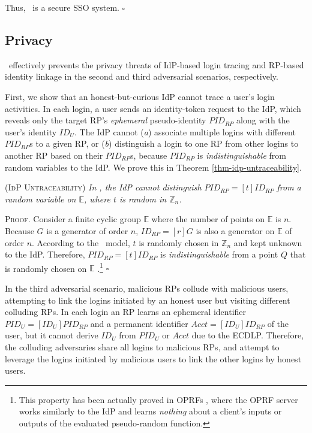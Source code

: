 Thus, \usso\ is a secure SSO system.
\hfill $\square$


\subsection{Privacy}
\label{sec-:analysis}
\usso\ effectively prevents the privacy threats of IdP-based login tracing and RP-based identity linkage in the second and third adversarial scenarios, respectively.

\newc
First, we show that an honest-but-curious IdP cannot trace a user's login activities. In each login, a user sends an identity-token request to the IdP, %
which reveals only the target RP's \emph{ephemeral} pseudo-identity $PID_{RP}$ along with the user's identity $ID_U$.
The IdP cannot (\emph{a}) associate multiple logins with different $PID_{RP}$s to a given RP, or (\emph{b}) distinguish a login to one RP from other logins to another RP based on their $PID_{RP}$s, because $PID_{RP}$ is \emph{indistinguishable} from random variables to the IdP.
We prove this in Theorem \ref{thm-idp-untraceability}.

\begin{thm}
\textsc{(IdP Untraceability)} \emph{In \usso, the IdP cannot distinguish $PID_{RP} = [t]ID_{RP}$ from a random variable on $\mathbb{E}$, where $t$ is random in $\mathbb{Z}_n$.}
\label{thm-idp-untraceability}
\end{thm}

\noindent \textsc{Proof.}
Consider a finite cyclic group $\mathbb{E}$ where the number of points on $\mathbb{E}$ is $n$.
Because $G$ is a generator of order $n$, $ID_{RP} = [r]G$ is also a generator on $\mathbb{E}$ of order $n$. According to the \dyu\ model, $t$ is randomly chosen in $\mathbb{Z}_n$ and kept unknown to the IdP. Therefore, $PID_{RP} = [t]ID_{RP}$ is \emph{indistinguishable} from a point $Q$ that is randomly chosen on $\mathbb{E}$ \cite{oprf-proved,voprf-proved,oprf-bitcoin-wallet}.\footnote{\newc This property has been actually proved in OPRFs \cite{oprf-proved,voprf-proved,oprf-bitcoin-wallet}, where the OPRF server works similarly to the IdP and learns \emph{nothing} about a client's inputs or outputs of the evaluated pseudo-random function.} \hfill $\square$


\vspace{2mm}

In the third adversarial scenario, malicious RPs collude with malicious users,
 attempting to link the logins initiated by an honest user but visiting different colluding RPs.
In each login an RP learns an ephemeral identifier $PID_{U} = [{ID_U}]{PID_{RP}}$ and a permanent identifier $Acct = [ID_U]ID_{RP}$ of the user, but it cannot derive $ID_U$ from $PID_{U}$ or $Acct$ due to the ECDLP.
Therefore, the colluding adversaries share all logins to malicious RPs,
    and attempt to leverage the logins initiated by malicious users to link the other logins by honest users.


